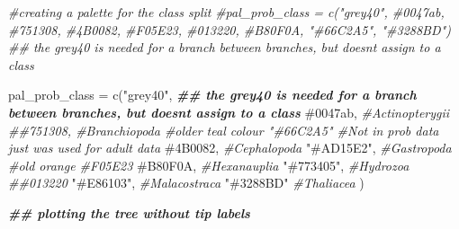 \documentclass[
]{article}
\newenvironment{Shaded}{\begin{snugshade}}{\end{snugshade}}
\newcommand{\CommentTok}[1]{\textcolor[rgb]{0.56,0.35,0.01}{\textit{#1}}}
\newcommand{\DocumentationTok}[1]{\textcolor[rgb]{0.56,0.35,0.01}{\textbf{\textit{#1}}}}
\newcommand{\FunctionTok}[1]{\textcolor[rgb]{0.00,0.00,0.00}{#1}}
\newcommand{\NormalTok}[1]{#1}
\newcommand{\OtherTok}[1]{\textcolor[rgb]{0.56,0.35,0.01}{#1}}
\newcommand{\StringTok}[1]{\textcolor[rgb]{0.31,0.60,0.02}{#1}}
\begin{document}
\begin{Shaded}
\begin{Highlighting}[]
\CommentTok{\#creating a palette for the class split}
\CommentTok{\#pal\_prob\_class = c("grey40", \textquotesingle{}\#0047ab\textquotesingle{}, \textquotesingle{}\#751308\textquotesingle{}, \textquotesingle{}\#4B0082\textquotesingle{}, \textquotesingle{}\#F05E23\textquotesingle{}, \textquotesingle{}\#013220\textquotesingle{}, \textquotesingle{}\#B80F0A\textquotesingle{}, "\#66C2A5", "\#3288BD") \#\# the grey40 is needed for a branch between branches, but doesn\textquotesingle{}t assign to a class}


\NormalTok{pal\_prob\_class }\OtherTok{=} \FunctionTok{c}\NormalTok{(}\StringTok{"grey40"}\NormalTok{, }\DocumentationTok{\#\# the grey40 is needed for a branch between branches, but doesn\textquotesingle{}t assign to a class}
                    \StringTok{\textquotesingle{}\#0047ab\textquotesingle{}}\NormalTok{, }\CommentTok{\#Actinopterygii}
                    \CommentTok{\#\textquotesingle{}\#751308\textquotesingle{}, \#Branchiopoda \#older teal colour "\#66C2A5" \#Not in prob data just was used for adult data}
                    \StringTok{\textquotesingle{}\#4B0082\textquotesingle{}}\NormalTok{, }\CommentTok{\#Cephalopoda}
                    \StringTok{"\#AD15E2"}\NormalTok{, }\CommentTok{\#Gastropoda \#old orange \textquotesingle{}\#F05E23\textquotesingle{}}
                    \StringTok{\textquotesingle{}\#B80F0A\textquotesingle{}}\NormalTok{, }\CommentTok{\#Hexanauplia}
                    \StringTok{"\#773405"}\NormalTok{, }\CommentTok{\#Hydrozoa \#\textquotesingle{}\#013220\textquotesingle{}}
                    \StringTok{"\#E86103"}\NormalTok{, }\CommentTok{\#Malacostraca \textquotesingle{}}
                    \StringTok{"\#3288BD"}  \CommentTok{\#Thaliacea}
\NormalTok{                    )}

\DocumentationTok{\#\# plotting the tree without tip labels}


\end{Highlighting}
\end{Shaded}
\end{document}
